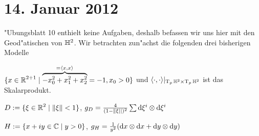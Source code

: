
\section{14. Januar 2012}
\setcounter{Aufg}{0} %
\setcounter{Loes}{0}

"Ubungsblatt 10 enthielt keine Aufgaben, deshalb befassen wir uns hier mit den Geod"atischen von $\mathbb{H}^2$.
Wir betrachten zun"achst die folgenden drei bisherigen Modelle \begin{description}[leftmargin=*]
\item[Hyperboloid:]
	$\{ x \in \operatorname{\mathbb{R}}^{2+1} \mid \overbrace{-x_0^2 + x_1^2 + x_2^2}^{= \langle x,x \rangle} = -1, x_0 > 0 \}$ und $\langle \cdot, \cdot \rangle|_{\operatorname{T}_p\mathbb{H}^2 \times \operatorname{T}_p\mathbb{H}^2}$ ist das Skalarprodukt.
\item[Poincare Kreisscheibenmodell:]
	$D := \{ \xi \in \operatorname{\mathbb{R}}^2 \mid \|\xi\| < 1 \}$, $g_D = \frac{4}{(1 - \|\xi||)^2} \sum \mathrm{d} \xi^{i} \otimes \mathrm{d} \xi^{i}$
\item[Poincare obere Halbebene Modell:]
	$H := \{ x + iy \in \operatorname{\mathbb{C}} \mid y > 0 \}$, $g_H = \frac{1}{y^2}(\mathrm{d} x \otimes \mathrm{d} x + \mathrm{d} y \otimes \mathrm{d} y)$
\end{description}


